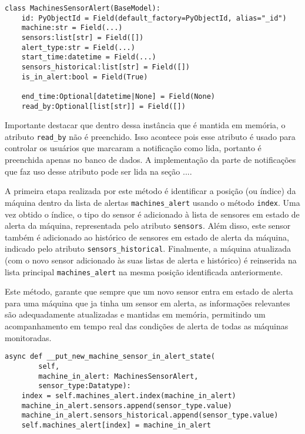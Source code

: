 \begin{verbatim}
class MachinesSensorAlert(BaseModel):
    id: PyObjectId = Field(default_factory=PyObjectId, alias="_id")
    machine:str = Field(...)
    sensors:list[str] = Field([])
    alert_type:str = Field(...)
    start_time:datetime = Field(...)
    sensors_historical:list[str] = Field([])
    is_in_alert:bool = Field(True)
    
    end_time:Optional[datetime|None] = Field(None)
    read_by:Optional[list[str]] = Field([])
\end{verbatim}

Importante destacar que dentro dessa instância que é mantida em memória, o atributo \texttt{read\_by} não é preenchido. Isso acontece pois esse atributo é usado para controlar os usuários que marcaram a notificação como lida, portanto é preenchida apenas no banco de dados. A implementação da parte de notificações que faz uso desse atributo pode ser lida na seção ....%


A primeira etapa realizada por este método é identificar a posição (ou índice) da máquina dentro da lista de alertas \texttt{machines\_alert} usando o método \texttt{index}. Uma vez obtido o índice, o tipo do sensor é adicionado à lista de sensores em estado de alerta da máquina, representada pelo atributo \texttt{sensors}. Além disso, este sensor também é adicionado ao histórico de sensores em estado de alerta da máquina, indicado pelo atributo \texttt{sensors\_historical}. Finalmente, a máquina atualizada (com o novo sensor adicionado às suas listas de alerta e histórico) é reinserida na lista principal \texttt{machines\_alert} na mesma posição identificada anteriormente.

Este método, garante que sempre que um novo sensor entra em estado de alerta para uma máquina que ja tinha um sensor em alerta, as informações relevantes são adequadamente atualizadas e mantidas em memória, permitindo um acompanhamento em tempo real das condições de alerta de todas as máquinas monitoradas.

\begin{verbatim}
async def __put_new_machine_sensor_in_alert_state(
        self,
        machine_in_alert: MachinesSensorAlert,
        sensor_type:Datatype):
    index = self.machines_alert.index(machine_in_alert)
    machine_in_alert.sensors.append(sensor_type.value)
    machine_in_alert.sensors_historical.append(sensor_type.value)
    self.machines_alert[index] = machine_in_alert
\end{verbatim}

